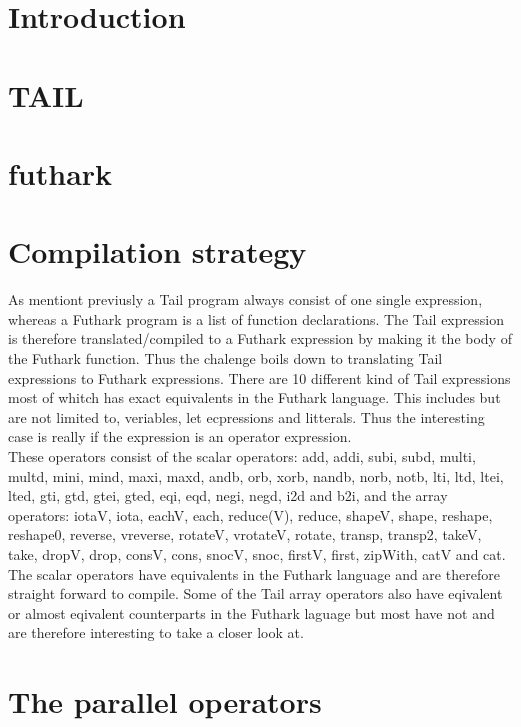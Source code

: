 \documentclass[11pt]{article}
\begin{document}
\section{Introduction}

\section{TAIL}

\section{futhark}

\section{Compilation strategy}
As mentiont previusly a Tail program always consist of one single expression, whereas a Futhark program is a list of function declarations. The Tail expression is therefore translated/compiled to a Futhark expression by making it the body of the Futhark function. 
Thus the chalenge boils down to translating Tail expressions to Futhark expressions. 
There are 10 different kind of Tail expressions most of whitch has exact equivalents in the Futhark language. This includes but are not limited to, veriables, let ecpressions and litterals. Thus the interesting case is really if the expression is an operator expression.\\

These operators consist of the scalar operators: add, addi, subi, subd, multi, multd, mini, mind, maxi, maxd, andb, orb, xorb, nandb, norb, notb, lti, ltd, ltei, lted, gti, gtd, gtei, gted, eqi, eqd, negi, negd, i2d and b2i, and the array operators: iotaV, iota, eachV, each, reduce(V), reduce, shapeV, shape, reshape, reshape0, reverse, vreverse, rotateV, vrotateV, rotate, transp, transp2, takeV, take, dropV, drop, consV, cons, snocV, snoc, firstV, first, zipWith, catV and cat. \\

The scalar operators have equivalents in the Futhark language and are therefore straight forward to compile. Some of the Tail array operators also have eqivalent or almost eqivalent counterparts in the Futhark laguage but most have not and are therefore interesting to take a closer look at.

\section{The parallel operators}
\end{document}
